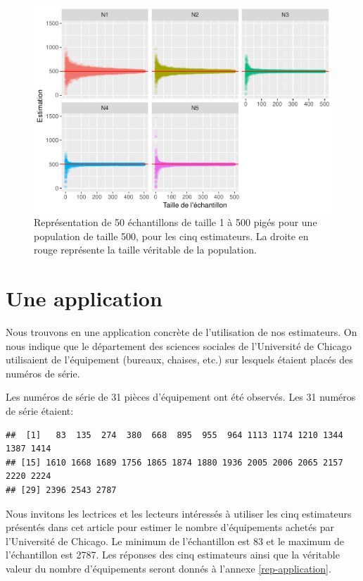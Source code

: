 \documentclass[10pt]{article}
\begin{document}
\begin{figure}[!htb]

{\centering \includegraphics[width=0.9\linewidth]{serial_number_amq_files/figure-latex/pop-1-500-1} 

}

\caption{Représentation de 50 échantillons de taille 1 à 500 pigés pour une population de taille 500, pour les cinq estimateurs. La droite en rouge représente la taille véritable de la population.}\label{fig:pop-1-500}
\end{figure}

\hypertarget{une-application}{%
\section{\texorpdfstring{Une application
\label{application}}{Une application }}\label{une-application}}

Nous trouvons en \cite{Goodman1954} une application concrète de
l'utilisation de nos estimateurs. On nous indique que le département des
sciences sociales de l'Université de Chicago utilisaient de l'équipement
(bureaux, chaises, etc.) sur lesquels étaient placés des numéros de
série.

Les numéros de série de 31 pièces d'équipement ont été observés. Les 31
numéros de série étaient:

\begin{verbatim}
##  [1]   83  135  274  380  668  895  955  964 1113 1174 1210 1344 1387 1414
## [15] 1610 1668 1689 1756 1865 1874 1880 1936 2005 2006 2065 2157 2220 2224
## [29] 2396 2543 2787
\end{verbatim}

Nous invitons les lectrices et les lecteurs intéressés à utiliser les
cinq estimateurs présentés dans cet article pour estimer le nombre
d'équipements achetés par l'Université de Chicago. Le minimum de
l'échantillon est 83 et le maximum de l'échantillon est 2787. Les
réponses des cinq estimateurs ainsi que la véritable valeur du nombre
d'équipements seront donnés à l'annexe \ref{rep-application}.
\end{document}

